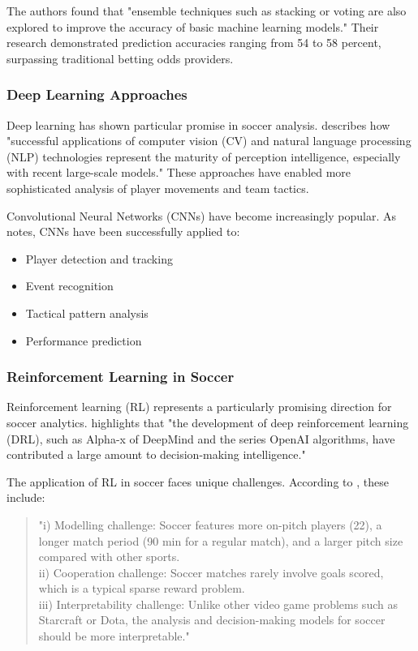 \documentclass[10pt,journal,compsoc]{IEEEtran}
\begin{document}
The authors found that "ensemble techniques such as stacking or voting are also explored to improve the accuracy of basic machine learning models." Their research demonstrated prediction accuracies ranging from 54 to 58 percent, surpassing traditional betting odds providers.

\subsubsection{Deep Learning Approaches}
Deep learning has shown particular promise in soccer analysis. \cite{pu2024orientation} describes how "successful applications of computer vision (CV) and natural language processing (NLP) technologies represent the maturity of perception intelligence, especially with recent large-scale models." These approaches have enabled more sophisticated analysis of player movements and team tactics.

Convolutional Neural Networks (CNNs) have become increasingly popular. As \cite{rico2023machine} notes, CNNs have been successfully applied to:
\begin{itemize}
    \item Player detection and tracking
    \item Event recognition
    \item Tactical pattern analysis
    \item Performance prediction
\end{itemize}

\subsubsection{Reinforcement Learning in Soccer}
Reinforcement learning (RL) represents a particularly promising direction for soccer analytics. \cite{pu2024orientation} highlights that "the development of deep reinforcement learning (DRL), such as Alpha-x of DeepMind and the series OpenAI algorithms, have contributed a large amount to decision-making intelligence."

The application of RL in soccer faces unique challenges. According to \cite{pu2024orientation}, these include:
\begin{quote}
"i) Modelling challenge: Soccer features more on-pitch players (22), a longer match period (90 min for a regular match), and a larger pitch size compared with other sports.\\
ii) Cooperation challenge: Soccer matches rarely involve goals scored, which is a typical sparse reward problem.\\
iii) Interpretability challenge: Unlike other video game problems such as Starcraft or Dota, the analysis and decision-making models for soccer should be more interpretable."
\end{quote}
\end{document}
